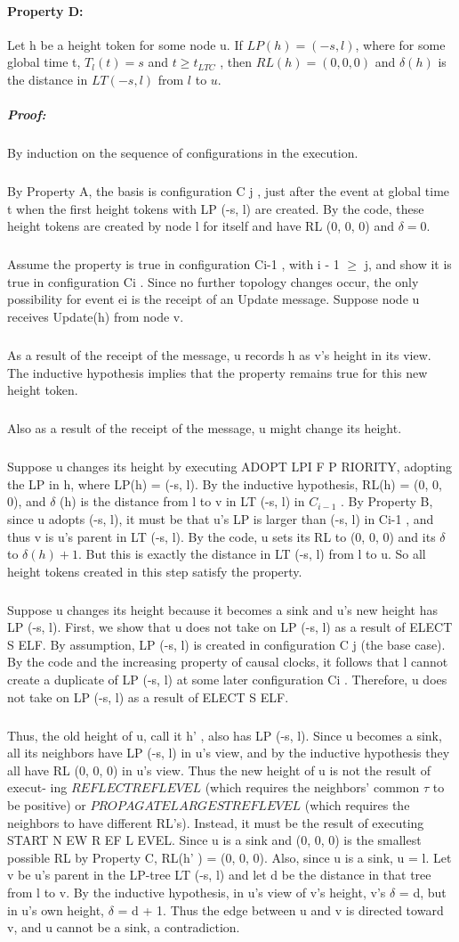 \paragraph{Property D:}Let h be a height token for some node u. If $LP(h) = (-s, l)$, where for some global time t, $T_l (t) = s$ and $t \geq t_{LTC}$ , then $RL(h) = (0, 0, 0)$ and $\delta (h)$ is the distance in $LT (-s, l)$ from $l$ to $u$.
\subparagraph{Proof:}By induction on the sequence of configurations in the execution.
\subparagraph{}By Property A, the basis is configuration C j , just after the event at global time t when the first height tokens with LP (-s, l) are created. By the code, these height tokens are created by node l for itself and have RL (0, 0, 0) and $\delta = 0$.
\subparagraph{}Assume the property is true in configuration Ci-1 , with i - 1 $\geq$ j, and show it is true in configuration Ci . Since no further topology changes occur, the only possibility for event ei is the receipt of an Update message. Suppose node u receives Update(h) from node v.
\subparagraph{}As a result of the receipt of the message, u records h as v's height in its view. The inductive hypothesis implies that the property remains true for this new height token.
\subparagraph{}Also as a result of the receipt of the message, u might change its height.
\subparagraph{}Suppose u changes its height by executing ADOPT LPI F P RIORITY, adopting the LP in h, where LP(h) = (-s, l). By the inductive hypothesis, RL(h) = (0, 0, 0), and $\delta$ (h) is the distance from l to v in LT (-s, l) in $C_{i-1}$ . By Property B, since u adopts (-s, l), it must be that u's LP is larger than (-s, l) in Ci-1 , and thus v is u's parent in LT (-s, l). By the code, u sets its RL to (0, 0, 0) and its $\delta$ to $\delta (h) + 1$. But this is exactly the distance in LT (-s, l) from l to u. So all height tokens created in this step satisfy the property.
\subparagraph{}Suppose u changes its height because it becomes a sink and u's new height has LP (-s, l). First, we show that u does not take on LP (-s, l) as a result of ELECT S ELF. By assumption, LP (-s, l) is created in configuration C j (the base case). By the code and the increasing property of causal clocks, it follows that l cannot create a duplicate of LP (-s, l) at some later configuration Ci . Therefore, u does not take on LP (-s, l) as a result of ELECT S ELF.
\subparagraph{}Thus, the old height of u, call it h' , also has LP (-s, l). Since u becomes a sink, all its neighbors have LP (-s, l) in u's view, and by the inductive hypothesis they all have RL (0, 0, 0) in u's view. Thus the new height of u is not the result of execut- ing $REFLECTREFLEVEL$ (which requires the neighbors' common $\tau$ to be positive) or $PROPAGATELARGESTREFLEVEL$ (which requires the neighbors to have different RL's). Instead, it must be the result of executing START N EW R EF L EVEL. Since u is a sink and (0, 0, 0) is the smallest possible RL by Property C, RL(h' ) = (0, 0, 0). Also, since u is a sink, u = l. Let v be u's parent in the LP-tree LT (-s, l) and let d be the distance in that tree from l to v. By the inductive hypothesis, in u's view of v's height, v's $\delta$ = d, but in u's own height, $\delta$ = d + 1. Thus the edge between u and v is directed toward v, and u cannot be a sink, a contradiction.
